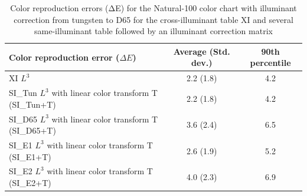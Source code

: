 \documentclass[]{spie}
\begin{document}
\begin {table}[H]
\begin{center}
\begin{tabular}{|l|c|c|}
\hline 
Color reproduction error ($\Delta E$) & Average (Std. dev.) & 90th percentile \\ \hline 
XI $L^3$ & 2.2 (1.8) & 4.2 \\  
SI\_Tun $L^3$ with linear color transform T (SI\_Tun+T) & 2.2 (1.8) & 4.2 \\  
SI\_D65 $L^3$ with linear color transform T (SI\_D65+T) & 3.6 (2.4) & 6.5 \\
SI\_E1 $L^3$ with linear color transform T (SI\_E1+T) & 2.6 (1.9) & 5.2 \\
SI\_E2 $L^3$ with linear color transform T (SI\_E2+T) & 4.0 (2.3) & 6.9 \\\hline 
\end{tabular} 
\end{center}\caption {Color reproduction errors (ΔE) for the Natural-100 color chart with illuminant correction from tungsten to D65 for the cross-illuminant table XI and several same-illuminant table followed by an illuminant correction matrix} 
\label{tab:colorErrorTable} 

\end{table}
\end{document}
